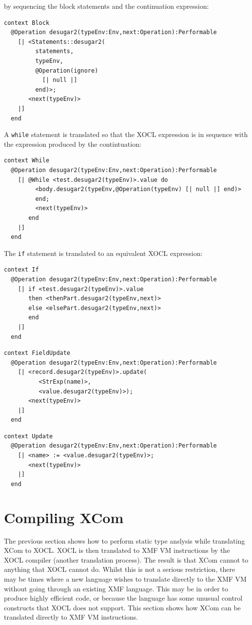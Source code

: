 \documentclass{article}
\begin{document}
by sequencing the block statements and the continuation expression:
\begin{verbatim}
context Block
  @Operation desugar2(typeEnv:Env,next:Operation):Performable
    [| <Statements::desugar2(
         statements,
         typeEnv,
         @Operation(ignore) 
           [| null |] 
         end)>;
       <next(typeEnv)> 
    |]
  end
\end{verbatim}
A {\tt while} statement is translated so that the XOCL expression is in sequence with the
expression produced by the contintuation:
\begin{verbatim}
context While
  @Operation desugar2(typeEnv:Env,next:Operation):Performable
    [| @While <test.desugar2(typeEnv)>.value do
         <body.desugar2(typeEnv,@Operation(typeEnv) [| null |] end)>
         end;
         <next(typeEnv)>
       end
    |]
  end
\end{verbatim}
The {\tt if} statement is translated to an equivalent XOCL expression:
\begin{verbatim}
context If
  @Operation desugar2(typeEnv:Env,next:Operation):Performable
    [| if <test.desugar2(typeEnv)>.value
       then <thenPart.desugar2(typeEnv,next)>
       else <elsePart.desugar2(typeEnv,next)>
       end
    |]
  end
\end{verbatim}

\begin{verbatim}
context FieldUpdate
  @Operation desugar2(typeEnv:Env,next:Operation):Performable
    [| <record.desugar2(typeEnv)>.update(
          <StrExp(name)>,
          <value.desugar2(typeEnv)>);
       <next(typeEnv)>
    |]
  end
\end{verbatim}

\begin{verbatim}
context Update
  @Operation desugar2(typeEnv:Env,next:Operation):Performable
    [| <name> := <value.desugar2(typeEnv)>;
       <next(typeEnv)>
    |]
  end
\end{verbatim}

\section{Compiling XCom}

The previous section shows how to perform static type anslysis while
translating XCom to XOCL. XOCL is then translated to XMF VM instructions by
the XOCL compiler (another translation process). The result is that XCom cannot
to anything that XOCL cannot do. Whilst this is not a serious restriction, there
may be times where a new language wishes to translate directly to the XMF VM
without going through an existing XMF language. This may be in order to produce
highly efficient code, or because the language has some unusual control constructs
that XOCL does not support. This section shows how XCom can be translated 
directly to XMF VM instructions.
\end{document}
